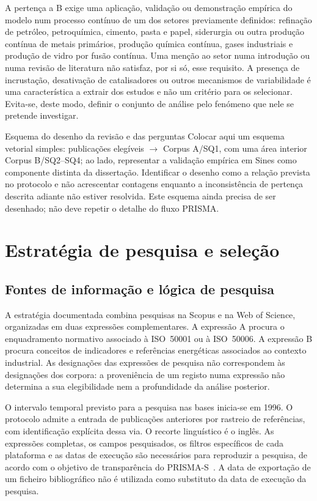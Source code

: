 A pertença a B exige uma aplicação, validação ou demonstração empírica
do modelo num processo contínuo de um dos setores previamente definidos:
refinação de petróleo, petroquímica, cimento, pasta e papel, siderurgia
ou outra produção contínua de metais primários, produção química contínua,
gases industriais e produção de vidro por fusão contínua. Uma menção
ao setor numa introdução ou numa revisão de literatura não satisfaz,
por si só, esse requisito. A presença de incrustação, desativação de
catalisadores ou outros mecanismos de variabilidade é uma característica
a extrair dos estudos e não um critério para os selecionar. Evita-se,
deste modo, definir o conjunto de análise pelo fenómeno que nele se
pretende investigar.

{Esquema do desenho da revisão e das perguntas}
{Colocar aqui um esquema vetorial simples: publicações elegíveis
$\rightarrow$ Corpus A/SQ1, com uma área interior Corpus B/SQ2--SQ4;
ao lado, representar a validação empírica em Sines como componente
distinta da dissertação. Identificar o desenho como a relação prevista
no protocolo e não acrescentar contagens enquanto a inconsistência de
pertença descrita adiante não estiver resolvida. Este esquema ainda
precisa de ser desenhado; não deve repetir o detalhe do fluxo PRISMA.}%


\section{Estratégia de pesquisa e seleção}
\label{sec:pesquisa}

\subsection{Fontes de informação e lógica de pesquisa}

A estratégia documentada combina pesquisas na Scopus e na Web of Science,
organizadas em duas expressões complementares. A expressão A procura o
enquadramento normativo associado à ISO~50001 ou à ISO~50006. A expressão B
procura conceitos de indicadores e referências energéticas associados
ao contexto industrial. As designações das expressões de pesquisa não
correspondem às designações dos corpora: a proveniência de um registo
numa expressão não determina a sua elegibilidade nem a profundidade
da análise posterior.

O intervalo temporal previsto para a pesquisa nas bases inicia-se em
1996. O protocolo admite a entrada de publicações anteriores por rastreio
de referências, com identificação explícita dessa via. O recorte
linguístico é o inglês. As expressões completas, os campos pesquisados,
os filtros específicos de cada plataforma e as datas de execução são
necessários para reproduzir a pesquisa, de acordo com o objetivo de
transparência do PRISMA-S~\cite{Rethlefsen2021PRISMAS}. A data de exportação
de um ficheiro bibliográfico não é utilizada como substituto da data
de execução da pesquisa.


